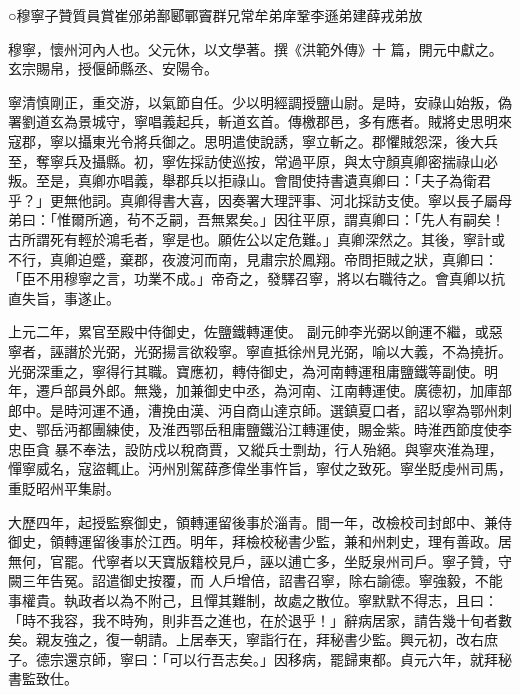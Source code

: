 
\begin{pinyinscope}

 ○穆寧子贊質員賞崔邠弟鄯郾鄲竇群兄常牟弟庠鞏李遜弟建薛戎弟放



 穆寧，懷州河內人也。父元休，以文學著。撰《洪範外傳》十
 篇，開元中獻之。玄宗賜帛，授偃師縣丞、安陽令。



 寧清慎剛正，重交游，以氣節自任。少以明經調授鹽山尉。是時，安祿山始叛，偽署劉道玄為景城守，寧唱義起兵，斬道玄首。傳檄郡邑，多有應者。賊將史思明來寇郡，寧以攝東光令將兵御之。思明遣使說誘，寧立斬之。郡懼賊怨深，後大兵至，奪寧兵及攝縣。初，寧佐採訪使巡按，常過平原，與太守顏真卿密揣祿山必叛。至是，真卿亦唱義，舉郡兵以拒祿山。會間使持書遺真卿曰：「夫子為衛君
 乎？」更無他詞。真卿得書大喜，因奏署大理評事、河北採訪支使。寧以長子屬母弟曰：「惟爾所適，茍不乏嗣，吾無累矣。」因往平原，謂真卿曰：「先人有嗣矣！古所謂死有輕於鴻毛者，寧是也。願佐公以定危難。」真卿深然之。其後，寧計或不行，真卿迫蹙，棄郡，夜渡河而南，見肅宗於鳳翔。帝問拒賊之狀，真卿曰：「臣不用穆寧之言，功業不成。」帝奇之，發驛召寧，將以右職待之。會真卿以抗直失旨，事遂止。



 上元二年，累官至殿中侍御史，佐鹽鐵轉運使。
 副元帥李光弼以餉運不繼，或惡寧者，誣譖於光弼，光弼揚言欲殺寧。寧直抵徐州見光弼，喻以大義，不為撓折。光弼深重之，寧得行其職。寶應初，轉侍御史，為河南轉運租庸鹽鐵等副使。明年，遷戶部員外郎。無幾，加兼御史中丞，為河南、江南轉運使。廣德初，加庫部郎中。是時河運不通，漕挽由漢、沔自商山達京師。選鎮夏口者，詔以寧為鄂州刺史、鄂岳沔都團練使，及淮西鄂岳租庸鹽鐵沿江轉運使，賜金紫。時淮西節度使李忠臣貪
 暴不奉法，設防戍以稅商賈，又縱兵士剽劫，行人殆絕。與寧夾淮為理，憚寧威名，寇盜輒止。沔州別駕薛彥偉坐事忤旨，寧仗之致死。寧坐貶虔州司馬，重貶昭州平集尉。



 大歷四年，起授監察御史，領轉運留後事於淄青。間一年，改檢校司封郎中、兼侍御史，領轉運留後事於江西。明年，拜檢校秘書少監，兼和州刺史，理有善政。居無何，官罷。代寧者以天寶版籍校見戶，誣以逋亡多，坐貶泉州司戶。寧子贊，守闕三年告冤。詔遣御史按覆，而
 人戶增倍，詔書召寧，除右諭德。寧強毅，不能事權貴。執政者以為不附己，且憚其難制，故處之散位。寧默默不得志，且曰：「時不我容，我不時殉，則非吾之進也，在於退乎！」辭病居家，請告幾十旬者數矣。親友強之，復一朝請。上居奉天，寧詣行在，拜秘書少監。興元初，改右庶子。德宗還京師，寧曰：「可以行吾志矣。」因移病，罷歸東都。貞元六年，就拜秘書監致仕。




\end{pinyinscope}
